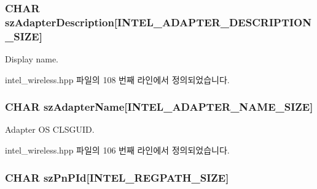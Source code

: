 \subsubsection[{\texorpdfstring{sz\+Adapter\+Description}{szAdapterDescription}}]{\setlength{\rightskip}{0pt plus 5cm}C\+H\+AR sz\+Adapter\+Description\mbox{[}{\bf I\+N\+T\+E\+L\+\_\+\+A\+D\+A\+P\+T\+E\+R\+\_\+\+D\+E\+S\+C\+R\+I\+P\+T\+I\+O\+N\+\_\+\+S\+I\+ZE}\mbox{]}}\hypertarget{struct_i_n_t_e_l___a_d_a_p_t_e_r___l_i_s_t___e_n_t_r_y_a9d04dc70c8726729a7ffad68bb8ffb22}{}\label{struct_i_n_t_e_l___a_d_a_p_t_e_r___l_i_s_t___e_n_t_r_y_a9d04dc70c8726729a7ffad68bb8ffb22}


Display name. 



intel\+\_\+wireless.\+hpp 파일의 108 번째 라인에서 정의되었습니다.

\subsubsection[{\texorpdfstring{sz\+Adapter\+Name}{szAdapterName}}]{\setlength{\rightskip}{0pt plus 5cm}C\+H\+AR sz\+Adapter\+Name\mbox{[}{\bf I\+N\+T\+E\+L\+\_\+\+A\+D\+A\+P\+T\+E\+R\+\_\+\+N\+A\+M\+E\+\_\+\+S\+I\+ZE}\mbox{]}}\hypertarget{struct_i_n_t_e_l___a_d_a_p_t_e_r___l_i_s_t___e_n_t_r_y_a60111ee05a8f654e13c2e8e79a4344f1}{}\label{struct_i_n_t_e_l___a_d_a_p_t_e_r___l_i_s_t___e_n_t_r_y_a60111ee05a8f654e13c2e8e79a4344f1}


Adapter OS C\+L\+S\+G\+U\+ID. 



intel\+\_\+wireless.\+hpp 파일의 106 번째 라인에서 정의되었습니다.

\subsubsection[{\texorpdfstring{sz\+Pn\+P\+Id}{szPnPId}}]{\setlength{\rightskip}{0pt plus 5cm}C\+H\+AR sz\+Pn\+P\+Id\mbox{[}{\bf I\+N\+T\+E\+L\+\_\+\+R\+E\+G\+P\+A\+T\+H\+\_\+\+S\+I\+ZE}\mbox{]}}\hypertarget{struct_i_n_t_e_l___a_d_a_p_t_e_r___l_i_s_t___e_n_t_r_y_a135fb44299c2c5a066e24535839ce70c}{}\label{struct_i_n_t_e_l___a_d_a_p_t_e_r___l_i_s_t___e_n_t_r_y_a135fb44299c2c5a066e24535839ce70c}


